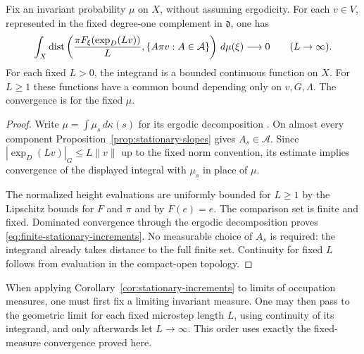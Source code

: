 \begin{corollary}\label{cor:stationary-increments}
Fix an invariant probability $\mu$ on $X$, without assuming ergodicity.
For each $v\in V$, represented in the fixed degree-one complement
in $\mathfrak d$, one has
\begin{equation}\label{eq:finite-stationary-increments}
 \int_X\operatorname{dist}\left(
   \frac{\pi F_\xi(\exp_D(Lv))}{L},
   \{A\pi v:A\in\mathcal A\}\right)\,d\mu(\xi)
 \longrightarrow0\qquad(L\to\infty).
\end{equation}
For each fixed $L>0$, the integrand is a bounded continuous function
on $X$.  For $L\ge1$ these functions have a common bound depending
only on $v,G,\Lambda$.  The convergence is for the fixed $\mu$.
\end{corollary}

\begin{proof}
Write $\mu=\int\mu_s\,d\kappa(s)$ for its ergodic decomposition
\cite[Theorem~5.2]{GreschonigSchmidt2000}.
On almost every component Proposition~\ref{prop:stationary-slopes}
gives $A_s\in\mathcal A$.  Since
$|\exp_D(Lv)|_G\le L\|v\|$ up to the fixed norm convention, its
estimate implies convergence of the displayed integral with $\mu_s$
in place of $\mu$.

The normalized height evaluations are uniformly bounded for $L\ge1$
by the Lipschitz bounds for $F$ and $\pi$ and by $F(e)=e$.
The comparison set is finite and fixed.  Dominated convergence
through the ergodic decomposition proves
\eqref{eq:finite-stationary-increments}.  No measurable choice of
$A_s$ is required: the integrand already takes distance to the full
finite set.  Continuity for fixed $L$ follows from evaluation in
the compact-open topology.
\end{proof}

When applying Corollary~\ref{cor:stationary-increments} to limits of
occupation measures, one must first fix a limiting invariant measure.
One may then pass to the geometric limit for each fixed microstep
length $L$, using continuity of its integrand, and only afterwards
let $L\to\infty$.  This order uses exactly the fixed-measure
convergence proved here.
